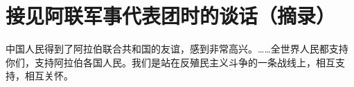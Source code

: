 \section[接见阿联军事代表团时的谈话（摘录）（一九五八年五月）]{接见阿联军事代表团时的谈话（摘录）}


中国人民得到了阿拉伯联合共和国的友谊，感到非常高兴。……全世界人民都支持你们，支持阿拉伯各国人民。我们是站在反殖民主义斗争的一条战线上，相互支持，相互关怀。


